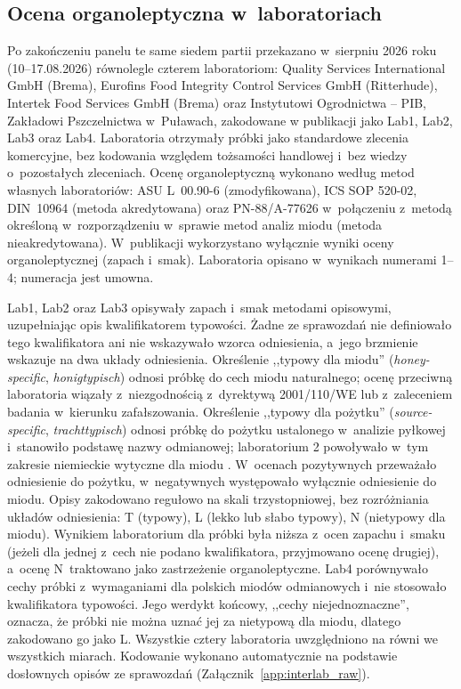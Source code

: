 \subsection{Ocena organoleptyczna w~laboratoriach}
\label{sub:interlab_metody} 

Po zakończeniu panelu te same siedem partii przekazano w~sierpniu 2026 roku
(10--17.08.2026) równolegle czterem laboratoriom: Quality Services
International GmbH (Brema), Eurofins Food Integrity Control Services GmbH
(Ritterhude), Intertek Food Services GmbH (Brema) oraz Instytutowi
Ogrodnictwa -- PIB, Zakładowi Pszczelnictwa w~Puławach, 
zakodowane w publikacji jako Lab1, Lab2, Lab3 oraz Lab4.
Laboratoria otrzymały próbki jako standardowe zlecenia komercyjne, bez kodowania
względem tożsamości handlowej i~bez wiedzy o~pozostałych zleceniach.
Ocenę organoleptyczną wykonano według metod własnych laboratoriów: ASU
L~00.90-6 (zmodyfikowana), ICS SOP 520-02, DIN~10964 (metoda akredytowana)
oraz PN-88/A-77626 \cite{PN8877626} w~połączeniu z~metodą określoną
w~rozporządzeniu w~sprawie metod analiz miodu \cite{RozporzadzenieMRiRW2009}
(metoda nieakredytowana). W~publikacji
wykorzystano wyłącznie wyniki oceny organoleptycznej (zapach i~smak).
Laboratoria opisano w~wynikach numerami 1--4; numeracja jest umowna.

Lab1, Lab2 oraz Lab3 opisywały zapach i~smak metodami opisowymi,
uzupełniając opis kwalifikatorem typowości. Żadne ze sprawozdań nie
definiowało tego kwalifikatora ani nie wskazywało wzorca odniesienia, a~jego
brzmienie wskazuje na dwa układy odniesienia. Określenie ,,typowy dla
miodu'' (\textit{honey-specific}, \textit{honigtypisch}) odnosi próbkę do
cech miodu naturalnego; ocenę przeciwną laboratoria wiązały z~niezgodnością
z~dyrektywą 2001/110/WE lub z~zaleceniem badania w~kierunku zafałszowania.
Określenie ,,typowy dla pożytku'' (\textit{source-specific},
\textit{trachttypisch}) odnosi próbkę do pożytku ustalonego w~analizie
pyłkowej i~stanowiło podstawę nazwy odmianowej; laboratorium 2 powoływało
w~tym zakresie niemieckie wytyczne dla miodu \cite{BMEL2011Honig}. W~ocenach pozytywnych
przeważało odniesienie do pożytku, w~negatywnych występowało wyłącznie
odniesienie do miodu. Opisy zakodowano regułowo na skali trzystopniowej, bez
rozróżniania układów odniesienia: T (typowy), L (lekko lub słabo typowy),
N (nietypowy dla miodu). Wynikiem laboratorium dla próbki była niższa z~ocen
zapachu i~smaku (jeżeli dla jednej z~cech nie podano kwalifikatora,
przyjmowano ocenę drugiej), a~ocenę N~traktowano jako zastrzeżenie
organoleptyczne. Lab4 porównywało cechy próbki z~wymaganiami dla polskich miodów odmianowych 
i~nie stosowało kwalifikatora typowości. Jego werdykt końcowy, ,,cechy niejednoznaczne'',
oznacza, że próbki nie można uznać jej za nietypową dla miodu, dlatego zakodowano go jako L. Wszystkie cztery
laboratoria uwzględniono na równi we wszystkich miarach. Kodowanie wykonano
automatycznie na podstawie dosłownych opisów ze sprawozdań
(Załącznik~\ref{app:interlab_raw}).

